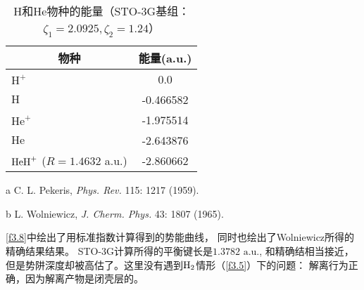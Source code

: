 \begin{table}[h]
\begin{threeparttable}
	\begin{tabular}{lc}
		\hline
		\multicolumn{1}{c}{物种} & 能量(a.u.)  \\ \hline
		$\text{H}^+$             &    0.0    \\
		$\text{H}$               & -0.466582 \\
		$\text{He}^+$            & -1.975514 \\
		$\text{He}$              & -2.643876\tnote{a} \\
		$\mathrm{HeH}^+$ ($R=1.4632$ a.u.) & -2.860662\tnote{b} \\ \hline
	\end{tabular}
	\begin{tablenotes}
		\item[a] C. L. Pekeris, \textit{Phys. Rev.} 115: 1217 (1959).
		\item[b] L. Wolniewicz, \textit{J. Cherm. Phys.} 43: 1807 (1965).
	\end{tablenotes}
\end{threeparttable}
	\centering\caption{$\text{H}$和$\text{He}$物种的能量（STO-3G基组： $\zeta_1=2.0925,\zeta_2=1.24$）}
	\label{t3.6}
\end{table}
\autoref{f3.8}中绘出了用标准指数计算得到的势能曲线， 同时也绘出了Wolniewicz所得的精确结果结果。 STO-3G计算所得的平衡键长是$1.3782\,\,\text{a.u.}$, 和精确结相当接近，但是势阱深度却被高估了。这里没有遇到$\mathrm{H}_2$情形（\autoref{f3.5}）下的问题： 解离行为正确，因为解离产物是闭壳层的。
